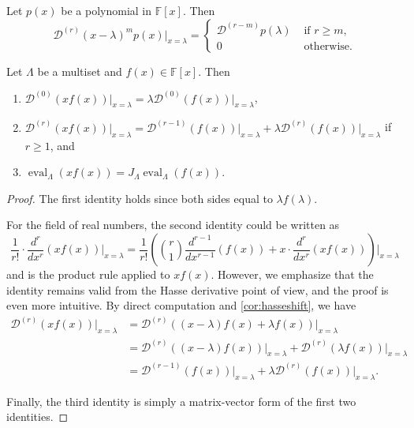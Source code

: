 \documentclass[10pt,a4paper]{amsart}
\newcommand{\eval}{\operatorname{eval}}
\begin{document}
\begin{corollary}
\label{cor:hasseshift}
Let $p(x)$ be a polynomial in $\mathbb{F}[x]$.  Then 
\[
    \mathcal{D}^{(r)}(x - \lambda)^m p(x) \big|_{x = \lambda} = 
    \begin{cases}
        \mathcal{D}^{(r - m)}p(\lambda) & \text{ if } r \geq m, \\
        0 & \text{ otherwise.}
    \end{cases}
\]

\end{corollary}

\begin{proposition}
\label{prop:prodrule}
Let $\Lambda$ be a multiset and $f(x)\in {\mathbb F}[x]$. Then
\begin{enumerate}
    \item $\mathcal{D}^{(0)}(xf(x))\big|_{x = \lambda} = \lambda \mathcal{D}^{(0)}(f(x))\big|_{x = \lambda}$, 
    \item $\mathcal{D}^{(r)}(xf(x))\big|_{x = \lambda} = \mathcal{D}^{(r-1)}(f(x))\big|_{x = \lambda} + \lambda \mathcal{D}^{(r)}(f(x))\big|_{x = \lambda}$ if $r \geq 1$, and   
    \item $\eval_\Lambda(xf(x)) = J_\Lambda \eval_\Lambda(f(x))$.
\end{enumerate}
\end{proposition}

\begin{proof}
The first identity holds since both sides equal to $\lambda f(\lambda)$.  

For the field of real numbers, the second identity could be written as 
\[
    \frac{1}{r!}\cdot \frac{d^r}{dx^r} (xf(x))\Big|_{x = \lambda} = \frac{1}{r!}\left( \binom{r}{1}\frac{d^{r-1}}{dx^{r-1}} (f(x)) + x\cdot \frac{d^r}{dx^r} (xf(x)) \right)\Big|_{x = \lambda}
\]
and is the product rule applied to $xf(x)$.  However, we emphasize that the identity remains valid from the Hasse derivative point of view, and the proof is even more intuitive.  By direct computation and \cref{cor:hasseshift}, we have 
\[
    \begin{aligned}
        \mathcal{D}^{(r)}(xf(x))\big|_{x = \lambda} &= \mathcal{D}^{(r)}((x - \lambda)f(x) + \lambda f(x))\big|_{x = \lambda} \\
        &= \mathcal{D}^{(r)}((x - \lambda)f(x))\big|_{x = \lambda} + \mathcal{D}^{(r)}(\lambda f(x))\big|_{x = \lambda} \\
        &= \mathcal{D}^{(r-1)}(f(x))\big|_{x = \lambda} + \lambda\mathcal{D}^{(r)}(f(x))\big|_{x = \lambda}.
    \end{aligned}
\]

Finally, the third identity is simply a matrix-vector form of the first two identities.  
\end{proof}
\end{document}

